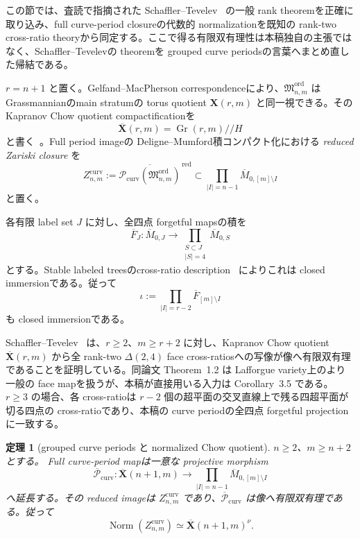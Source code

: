 \documentclass[11pt,a4paper]{ltjsarticle}
\newcommand{\Norm}{\operatorname{Norm}}
\newcommand{\Gr}{\operatorname{Gr}}
\newcommand{\ov}{\overline}
\newcommand{\cP}{\mathcal P}
\newcommand{\Mord}{\mathfrak M^{\mathrm{ord}}}
\theoremstyle{plain}
\newtheorem{theorem}{定理}[section]
\theoremstyle{definition}
\theoremstyle{remark}
\begin{document}
この節では、査読で指摘された Schaffler--Tevelev~\cite{ST} の一般 rank theoremを正確に取り込み、full curve-period closureの代数的 normalizationを既知の rank-two cross-ratio theoryから同定する。ここで得る有限双有理性は本稿独自の主張ではなく、Schaffler--Tevelevの theoremを grouped curve periodsの言葉へまとめ直した帰結である。

$r=n+1$ と置く。Gelfand--MacPherson correspondenceにより、$\Mord_{n,m}$ は Grassmannianのmain stratumの torus quotient $\mathbf X(r,m)$ と同一視できる。その Kapranov Chow quotient compactificationを
\[
 \ov{\mathbf X}(r,m)=\Gr(r,m)//H
\]
と書く~\cite{Kapranov,KT,HKT}。Full period imageの Deligne--Mumford積コンパクト化における \emph{reduced Zariski closure} を
\begin{equation}
\label{eq:Zcurv}
 Z_{n,m}^{\mathrm{curv}}
 :=\overline{\cP_{\mathrm{curv}}(\Mord_{n,m})}^{\,\mathrm{red}}
 \subset\prod_{|I|=n-1}\ov M_{0,[m]\setminus I}
\end{equation}
と置く。

各有限 label set $J$ に対し、全四点 forgetful mapsの積を
\[
 \ov F_J:\ov M_{0,J}\longrightarrow
 \prod_{\substack{S\subset J\\|S|=4}}\ov M_{0,S}
\]
とする。Stable labeled treesのcross-ratio description~\cite{GHP} によりこれは closed immersionである。従って
\[
 \iota:=\prod_{|I|=r-2}\ov F_{[m]\setminus I}
\]
も closed immersionである。

Schaffler--Tevelev~\cite[Corollary~3.5]{ST} は、$r\ge2$、$m\ge r+2$ に対し、Kapranov Chow quotient $\ov{\mathbf X}(r,m)$ から全 rank-two $\Delta(2,4)$ face cross-ratiosへの写像が像へ有限双有理であることを証明している。同論文 Theorem~1.2 は Lafforgue variety上のより一般の face mapを扱うが、本稿が直接用いる入力は Corollary~3.5 である。$r\ge3$ の場合、各 cross-ratioは $r-2$ 個の超平面の交叉直線上で残る四超平面が切る四点の cross-ratioであり、本稿の curve periodの全四点 forgetful projectionに一致する。

\begin{theorem}[grouped curve periods と normalized Chow quotient]
\label{thm:period-compactification}
$n\ge2$、$m\ge n+2$ とする。
Full curve-period mapは一意な projective morphism
\begin{equation}
\label{eq:extended-period}
 \ov{\cP}_{\mathrm{curv}}:
 \ov{\mathbf X}(n+1,m)
 \longrightarrow
 \prod_{|I|=n-1}\ov M_{0,[m]\setminus I}
\end{equation}
へ延長する。その reduced imageは $Z_{n,m}^{\mathrm{curv}}$ であり、$\ov{\cP}_{\mathrm{curv}}$ は像へ有限双有理である。従って
\begin{equation}
\label{eq:normalization-chow}
 \Norm(Z_{n,m}^{\mathrm{curv}})
 \simeq
 \ov{\mathbf X}(n+1,m)^{\nu}.
\end{equation}
\end{theorem}
\end{document}
